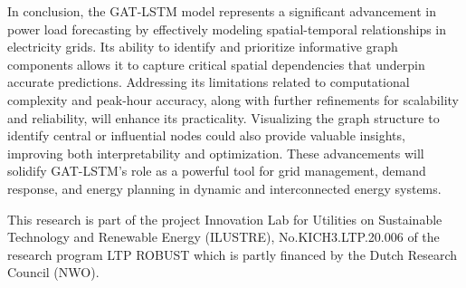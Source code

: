 \documentclass[sigconf,nonacm]{acmart}
\begin{document}
\par In conclusion, the GAT-LSTM model represents a significant advancement in power load forecasting by effectively modeling spatial-temporal relationships in electricity grids. Its ability to identify and prioritize informative graph components allows it to capture critical spatial dependencies that underpin accurate predictions. Addressing its limitations related to computational complexity and peak-hour accuracy, along with further refinements for scalability and reliability, will enhance its practicality. Visualizing the graph structure to identify central or influential nodes could also provide valuable insights, improving both interpretability and optimization. These advancements will solidify GAT-LSTM's role as a powerful tool for grid management, demand response, and energy planning in dynamic and interconnected energy systems.



\begin{acks}
\small{This research is part of the project Innovation Lab for Utilities on Sustainable Technology and Renewable Energy (ILUSTRE), No.KICH3.LTP.20.006 of the research program LTP ROBUST which is partly financed by the Dutch Research Council (NWO)}.
\end{acks}




\end{document}
